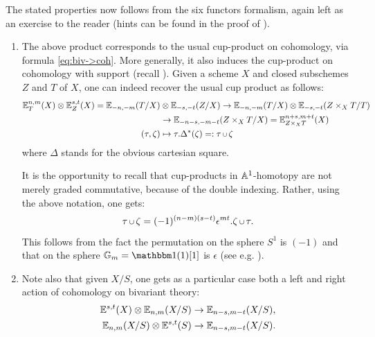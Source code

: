 The stated properties now follows from the six functors formalism,
again left as an exercise to the reader (hints can be found in the proof of \cite[Prop. 1.2.10]{Deg12}).

\begin{rem}
\begin{enumerate}[leftmargin=*]
\item The above product corresponds to the usual cup-product on cohomology, via formula \eqref{eq:biv->coh}.
More generally, it also induces the cup-product on cohomology with support (recall ).
Given a scheme $X$ and closed subschemes $Z$ and $T$ of $X$, one can indeed recover the usual cup product as follows:
\begin{align*}
\E^{n,m}_T(X) \otimes \E^{s,t}_Z(X)=\E_{-n,-m}(T/X) & \otimes \E_{-s,-t}(Z/X)
\rightarrow \E_{-n,-m}(T/X) \otimes \E_{-s,-t}(Z \times_X T/T) \\
& \rightarrow \E_{-n-s,-m-t}(Z \times_X T/X)=\E^{n+s,m+t}_{Z \times_X T}(X) \\
(\tau,\zeta) &\mapsto \tau.\Delta^*(\zeta)=:\tau \cupp \zeta
\end{align*}
where $\Delta$ stands for the obvious cartesian square.

It is the opportunity to recall that cup-products in $\AA^1$-homotopy are not merely graded commutative, because of the double indexing.
Rather, using the above notation, one gets:
$$
\tau \cupp \zeta=(-1)^{(n-m)(s-t)}\epsilon^{mt}.\zeta \cupp \tau.
$$
This follows from the fact the permutation on the sphere $S^1$ is $(-1)$
and that on the sphere $\GG=\un(1)[1]$ is $\epsilon$ (see e.g. \cite[Lem. 6.1.1]{MorTri}).
\item Note also that given $X/S$,
one gets as a particular case both a left and right action of cohomology on bivariant theory:
\begin{align*}
\E^{s,t}(X) \otimes \E_{n,m}(X/S) & \rightarrow \E_{n-s,m-t}(X/S), \\
\E_{n,m}(X/S) \otimes \E^{s,t}(S) & \rightarrow \E_{n-s,m-t}(X/S).
\end{align*}
\end{enumerate}
\end{rem}

